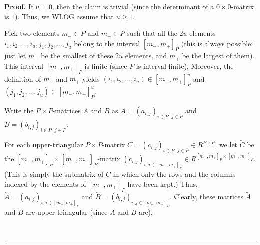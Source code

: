 \documentclass[numbers=enddot,12pt,final,onecolumn,notitlepage]{scrartcl}%
\numberwithin{exer}{section}
\theoremstyle{definition}
\newenvironment{proof}[1][Proof]{\noindent\textbf{#1.} }{\ \rule{0.5em}{0.5em}}
\theoremstyle{plainsl}
\begin{document}
\begin{proof}
If $u=0$, then the claim is trivial (since the determinant of a $0\times
0$-matrix is $1$). Thus, we WLOG assume that $u\geq1$.

Pick two elements $m_{-}\in P$ and $m_{+}\in P$ such that all the $2u$
elements $i_{1},i_{2},\ldots,i_{u},j_{1},j_{2},\ldots,j_{u}$ belong to the
interval $\left[  m_{-},m_{+}\right]  _{P}$ (this is always possible: just let
$m_{-}$ be the smallest of these $2u$ elements, and $m_{+}$ be the largest of
them). This interval $\left[  m_{-},m_{+}\right]  _{P}$ is finite (since $P$
is interval-finite). Moreover, the definition of $m_{-}$ and $m_{+}$ yields
$\left(  i_{1},i_{2},\ldots,i_{u}\right)  \in\left[  m_{-},m_{+}\right]
_{P}^{u}$ and $\left(  j_{1},j_{2},\ldots,j_{u}\right)  \in\left[  m_{-}%
,m_{+}\right]  _{P}^{u}$.

Write the $P\times P$-matrices $A$ and $B$ as $A=\left(  a_{i,j}\right)
_{i\in P,\ j\in P}$ and $B=\left(  b_{i,j}\right)  _{i\in P,\ j\in P}$.

For each upper-triangular $P\times P$-matrix $C=\left(  c_{i,j}\right)  _{i\in
P,\ j\in P}\in R^{P\times P}$, we let $\widetilde{C}$ be the $\left[
m_{-},m_{+}\right]  _{P}\times\left[  m_{-},m_{+}\right]  _{P}$-matrix
$\left(  c_{i,j}\right)  _{i,j\in\left[  m_{-},m_{+}\right]  _{P}}\in
R^{\left[  m_{-},m_{+}\right]  _{P}\times\left[  m_{-},m_{+}\right]  _{P}}$.
(This is simply the submatrix of $C$ in which only the rows and the columns
indexed by the elements of $\left[  m_{-},m_{+}\right]  _{P}$ have been kept.)
Thus, $\widetilde{A}=\left(  a_{i,j}\right)  _{i,j\in\left[  m_{-}%
,m_{+}\right]  _{P}}$ and $\widetilde{B}=\left(  b_{i,j}\right)
_{i,j\in\left[  m_{-},m_{+}\right]  _{P}}$. Clearly, these matrices
$\widetilde{A}$ and $\widetilde{B}$ are upper-triangular (since $A$ and $B$ are).


\end{proof}
\end{document}
